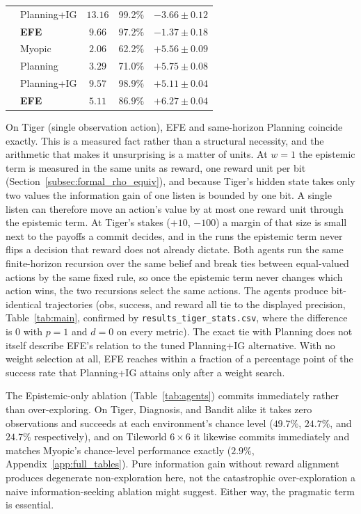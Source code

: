 \begin{table}[ht]
\begin{tablebody}
\begin{tabular}{llccc}
& Planning+IG & $13.16$ & 99.2\% & $-3.66 \pm 0.12$ \\
& \textbf{EFE} & $\mathbf{9.66}$ & $\mathbf{97.2\%}$ & $\mathbf{-1.37 \pm 0.18}$ \\
\midrule
{} & Myopic & $2.06$ & 62.2\% & $+5.56 \pm 0.09$ \\
& Planning & $3.29$ & 71.0\% & $+5.75 \pm 0.08$ \\
& Planning+IG & $9.57$ & 98.9\% & $+5.11 \pm 0.04$ \\
& \textbf{EFE} & $\mathbf{5.11}$ & $\mathbf{86.9\%}$ & $\mathbf{+6.27 \pm 0.04}$ \\
\bottomrule
\end{tabular}
\end{tablebody}
\end{table}

On Tiger (single observation action), EFE and same-horizon Planning coincide exactly. This is a measured fact rather than a structural necessity, and the arithmetic that makes it unsurprising is a matter of units. At $w{=}1$ the epistemic term is measured in the same units as reward, one reward unit per bit (Section~\ref{subsec:formal_rho_equiv}), and because Tiger's hidden state takes only two values the information gain of one listen is bounded by one bit. A single listen can therefore move an action's value by at most one reward unit through the epistemic term. At Tiger's stakes ($+10$, $-100$) a margin of that size is small next to the payoffs a commit decides, and in the runs the epistemic term never flips a decision that reward does not already dictate. Both agents run the same finite-horizon recursion over the same belief and break ties between equal-valued actions by the same fixed rule, so once the epistemic term never changes which action wins, the two recursions select the same actions. The agents produce bit-identical trajectories (obs, success, and reward all tie to the displayed precision, Table~\ref{tab:main}, confirmed by \texttt{results\_\allowbreak tiger\_\allowbreak stats.csv}, where the difference is $0$ with $p{=}1$ and $d{=}0$ on every metric). The exact tie with Planning does not itself describe EFE's relation to the tuned Planning+IG alternative. With no weight selection at all, EFE reaches within a fraction of a percentage point of the success rate that Planning+IG attains only after a weight search.

The Epistemic-only ablation (Table~\ref{tab:agents}) commits immediately rather than over-exploring. On Tiger, Diagnosis, and Bandit alike it takes zero observations and succeeds at each environment's chance level ($49.7\%$, $24.7\%$, and $24.7\%$ respectively), and on Tileworld $6{\times}6$ it likewise commits immediately and matches Myopic's chance-level performance exactly ($2.9\%$, Appendix~\ref{app:full_tables}). Pure information gain without reward alignment produces degenerate non-exploration here, not the catastrophic over-exploration a naive information-seeking ablation might suggest. Either way, the pragmatic term is essential.

